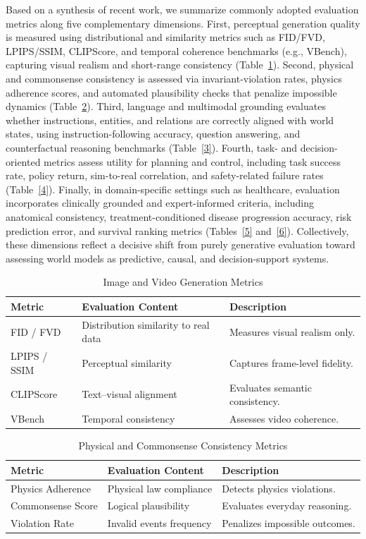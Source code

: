 \documentclass[pdflatex,sn-mathphys-num]{sn-jnl}
\theoremstyle{thmstyleone}%
\theoremstyle{thmstyletwo}%
\theoremstyle{thmstylethree}%
\begin{document}
Based on a synthesis of recent work, we summarize commonly adopted evaluation metrics along five complementary dimensions. First, perceptual generation quality is measured using distributional and similarity metrics such as FID/FVD, LPIPS/SSIM, CLIPScore, and temporal coherence benchmarks (e.g., VBench), capturing visual realism and short-range consistency (Table~\ref{1}). Second, physical and commonsense consistency is assessed via invariant-violation rates, physics adherence scores, and automated plausibility checks that penalize impossible dynamics (Table~\ref{2}). Third, language and multimodal grounding evaluates whether instructions, entities, and relations are correctly aligned with world states, using instruction-following accuracy, question answering, and counterfactual reasoning benchmarks (Table~\ref{3}). Fourth, task- and decision-oriented metrics assess utility for planning and control, including task success rate, policy return, sim-to-real correlation, and safety-related failure rates (Table~\ref{4}). Finally, in domain-specific settings such as healthcare, evaluation incorporates clinically grounded and expert-informed criteria, including anatomical consistency, treatment-conditioned disease progression accuracy, risk prediction error, and survival ranking metrics (Tables~\ref{5} and~\ref{6}). Collectively, these dimensions reflect a decisive shift from purely generative evaluation toward assessing world models as predictive, causal, and decision-support systems.



\begin{table}[t!]
\centering
\caption{Image and Video Generation Metrics}
\label{1}
\begin{tabular}{l|l|l}
\hline
\textbf{Metric} & \textbf{Evaluation Content} & \textbf{Description} \\
\hline
FID / FVD & Distribution similarity to real data & Measures visual realism only. \\
LPIPS / SSIM & Perceptual similarity & Captures frame-level fidelity. \\
CLIPScore & Text--visual alignment & Evaluates semantic consistency. \\
VBench & Temporal consistency & Assesses video coherence. \\
\hline
\end{tabular}
\end{table}


\begin{table}[t!]
\centering
\caption{Physical and Commonsense Consistency Metrics}
\label{2}
\begin{tabular}{l|l|l}
\hline
\textbf{Metric} & \textbf{Evaluation Content} & \textbf{Description} \\
\hline
Physics Adherence & Physical law compliance & Detects physics violations. \\
Commonsense Score & Logical plausibility & Evaluates everyday reasoning. \\
Violation Rate & Invalid events frequency & Penalizes impossible outcomes. \\
\hline
\end{tabular}
\end{table}
\end{document}
